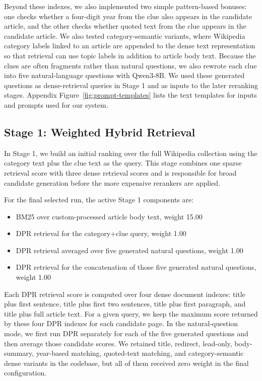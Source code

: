\documentclass[11pt]{article}
\begin{document}
Beyond these indexes, we also implemented two simple pattern-based bonuses: one checks whether a four-digit year from the clue also appears in the candidate article, and the other checks whether quoted text from the clue appears in the candidate article. We also tested category-semantic variants, where Wikipedia category labels linked to an article are appended to the dense text representation so that retrieval can use topic labels in addition to article body text. 
Because the clues are often fragments rather than natural questions, we also rewrote each clue into five natural-language questions with Qwen3-8B. 
We used these generated questions as dense-retrieval queries in Stage 1 and as inputs to the later reranking stages. Appendix Figure~\ref{fig:prompt-templates} lists the text templates for inputs and prompts used for our system.

\subsection{Stage 1: Weighted Hybrid Retrieval}

In Stage 1, we build an initial ranking over the full Wikipedia collection using the category text plus the clue text as the query. This stage combines one sparse retrieval score with three dense retrieval scores and is responsible for broad candidate generation before the more expensive rerankers are applied.

For the final selected run, the active Stage 1 components are:

\begin{itemize}
  \item BM25 over custom-processed article body text, weight 15.00
  \item DPR retrieval for the category+clue query, weight 1.00
  \item DPR retrieval averaged over five generated natural questions, weight 1.00
  \item DPR retrieval for the concatenation of those five generated natural questions, weight 1.00
\end{itemize}

Each DPR retrieval score is computed over four dense document indexes: title plus first sentence, title plus first two sentences, title plus first paragraph, and title plus full article text. For a given query, we keep the maximum score returned by these four DPR indexes for each candidate page. In the natural-question mode, we first run DPR separately for each of the five generated questions and then average those candidate scores. We retained title, redirect, lead-only, body-summary, year-based matching, quoted-text matching, and category-semantic dense variants in the codebase, but all of them received zero weight in the final configuration.
\end{document}
